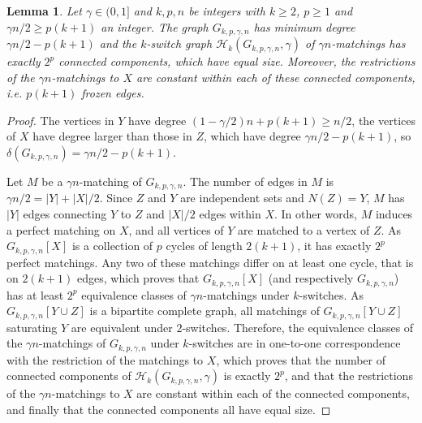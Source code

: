 \documentclass[11pt,a4paper]{article}
\newtheorem{lemma}[theorem]{Lemma}
\theoremstyle{definition}
\begin{document}
\begin{lemma}\label{lem:non_connectedness}
  Let $\gamma \in (0,1]$ and $k, p, n$ be integers with $k \ge 2$, $p\ge 1$ and
  $\gamma n/2 \ge p(k+1)$ an integer. The graph $G_{k,p,\gamma,n}$ has minimum degree
  $\gamma n/2-p(k+1)$ and the $k$-switch graph $\mathcal{H}_k(G_{k,p,\gamma,n}, \gamma)$ of $\gamma n$-matchings has exactly $2^p$ connected components, which have equal
  size. Moreover, the restrictions of the $\gamma n$-matchings to $X$ are constant
  within each of these connected components, i.e. $p(k+1)$ frozen edges.
\end{lemma}
\begin{proof}
  The vertices in $Y$ have degree $(1-\gamma/2)n + p(k+1) \ge n/2$, the vertices
  of $X$ have degree larger than those in $Z$, which have degree
  $\gamma n/2 - p(k+1)$, so $\delta(G_{k,p,\gamma,n}) = \gamma n/2 - p(k+1)$.

  Let $M$ be a $\gamma n$-matching of $G_{k,p,\gamma,n}$. The number of edges in
  $M$ is $\gamma n/2= |Y| + |X|/2$. Since $Z$ and $Y$ are independent sets and $N(Z) = Y$, $M$ has $|Y|$ edges connecting $Y$ to
  $Z$ and $|X|/2$ edges within $X$. In other words, $M$ induces a perfect
  matching on $X$, and all vertices of $Y$ are matched to a vertex of $Z$. As
  $G_{k,p,\gamma,n}[X]$ is a collection of $p$ cycles of length $2(k+1)$, it has
  exactly $2^p$ perfect matchings. Any two of these matchings differ on at least
  one cycle, that is on $2(k+1)$ edges, which proves that $G_{k,p,\gamma,n}[X]$
  (and respectively $G_{k,p,\gamma,n}$) has at least $2^p$ equivalence classes
  of $\gamma n$-matchings under $k$-switches. As $G_{k,p,\gamma,n}[Y \cup Z]$ is
  a bipartite complete graph, all matchings of $G_{k,p,\gamma,n}[Y\cup Z]$ saturating $Y$ are
  equivalent under $2$-switches. Therefore, the equivalence classes of the
  $\gamma n$-matchings of $G_{k,p,\gamma,n}$ under $k$-switches are in one-to-one
  correspondence with the restriction of the matchings to $X$, which proves that
  the number of connected components of $\mathcal{H}_k(G_{k,p,\gamma,n}, \gamma)$ is exactly $2^p$, and that the restrictions of the $\gamma n$-matchings to $X$ are constant within each of the connected components, and finally that the connected components all have equal size.
\end{proof}
\end{document}
